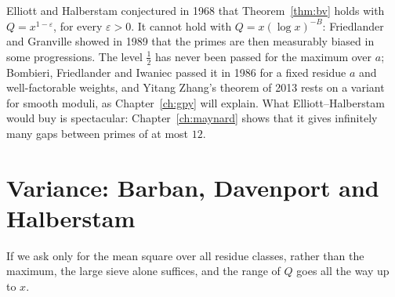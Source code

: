 \begin{remark}
Elliott and Halberstam conjectured in 1968 that Theorem~\ref{thm:bv} holds with $Q=x^{1-\varepsilon}$, for every $\varepsilon>0$. It cannot hold with $Q=x(\log x)^{-B}$: Friedlander and Granville showed in 1989 that the primes are then measurably biased in some progressions. The level $\frac12$ has never been passed for the maximum over $a$; Bombieri, Friedlander and Iwaniec passed it in 1986 for a fixed residue $a$ and well-factorable weights, and Yitang Zhang's theorem of 2013 rests on a variant for smooth moduli, as Chapter~\ref{ch:gpy} will explain. What Elliott--Halberstam would buy is spectacular: Chapter~\ref{ch:maynard} shows that it gives infinitely many gaps between primes of at most $12$.
\end{remark}

\section{Variance: Barban, Davenport and Halberstam}

If we ask only for the mean square over all residue classes, rather than the maximum, the large sieve alone suffices, and the range of $Q$ goes all the way up to $x$.

